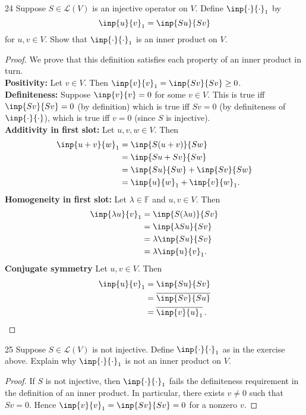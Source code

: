 \documentclass{extarticle}
\newenvironment{problem}[1]{\begin{prob*}{#1}{}}{\end{prob*}}
\newcommand{\F}{\mathbb{F}}
\newcommand{\Hom}{\mathcal{L}}
\newcommand\widebar[1]{\mathop{\overline{#1}}}
\begin{document}
\begin{problem}{24}
Suppose $S\in\Hom(V)$ is an injective operator on $V$.  Define $\inp{\cdot}{\cdot}_1$ by
\begin{equation*}
\inp{u}{v}_1 = \inp{Su}{Sv}
\end{equation*}
for $u,v\in V$.  Show that $\inp{\cdot}{\cdot}_1$ is an inner product on $V$.
\end{problem}
\begin{proof}
We prove that this definition satisfies each property of an inner product in turn.\\
\textbf{Positivity: } Let $v\in V$.  Then $\inp{v}{v}_1 = \inp{Sv}{Sv} \geq 0$.\\
\textbf{Definiteness: } Suppose $\inp{v}{v} = 0$ for some $v\in V$.  This is true iff $\inp{Sv}{Sv} = 0$ (by definition) which is true iff $Sv = 0$ (by definiteness of $\inp{\cdot}{\cdot}$), which is true iff $v = 0$ (since $S$ is injective).\\
\textbf{Additivity in first slot: } Let $u, v, w\in V$.  Then
\begin{align*}
\inp{u + v}{w}_1 &= \inp{S(u + v)}{Sw}\\
&= \inp{Su + Sv}{Sw}\\
&= \inp{Su}{Sw} + \inp{Sv}{Sw}\\
&= \inp{u}{w}_1 + \inp{v}{w}_1.
\end{align*}
\textbf{Homogeneity in first slot: } Let $\lambda\in\F$ and $u, v\in V$.  Then
\begin{align*}
\inp{\lambda u}{v}_1 &= \inp{S(\lambda u)}{Sv}\\
&= \inp{\lambda Su}{Sv}\\
&= \lambda \inp{Su}{Sv}\\
&= \lambda\inp{u}{v}_1.
\end{align*}
\textbf{Conjugate symmetry} Let $u,v\in V$.  Then
\begin{align*}
\inp{u}{v}_1 &= \inp{Su}{Sv}\\
&= \widebar{\inp{Sv}{Su}}\\
&= \widebar{\inp{v}{u}_1}.
\end{align*}
\end{proof}

\begin{problem}{25}
Suppose $S\in\Hom(V)$ is not injective.  Define $\inp{\cdot}{\cdot}_1$ as in the exercise above.  Explain why $\inp{\cdot}{\cdot}_1$ is not an inner product on $V$.
\end{problem}
\begin{proof}
If $S$ is not injective, then $\inp{\cdot}{\cdot}_1$ fails the definiteness requirement in the definition of an inner product.  In particular, there exists $v\neq 0$ such that $Sv =0$.  Hence $\inp{v}{v}_1 = \inp{Sv}{Sv} = 0$ for a nonzero $v$.
\end{proof}
\end{document}
